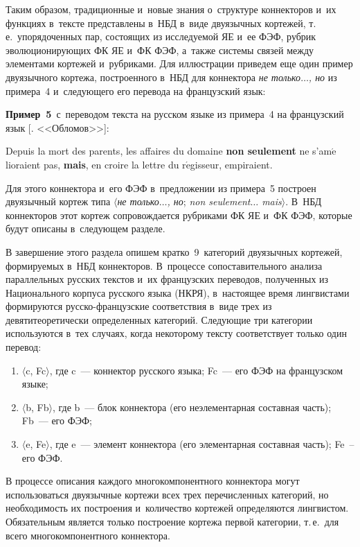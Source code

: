 \begin{multicols}{2}
  Таким образом, традиционные и~новые знания о~структуре коннекторов 
и~их функциях в~тексте представлены в~НБД в~виде двуязычных кортежей, 
т.\,е.\ упорядоченных пар, состоящих из исследуемой ЯЕ
и~ее ФЭФ, рубрик эволюционирующих ФК ЯЕ и~ФК ФЭФ, а~так\-же сис\-те\-мы 
связей между элементами кортежей и~руб\-ри\-ка\-ми. Для иллюстрации 
приведем еще один пример двуязычного кортежа, построенного в~НБД для 
коннектора \textit{не только$\ldots$, но} из примера~4 и~сле\-ду\-юще\-го его 
перевода на французский язык:
  
  \smallskip
  
  \noindent
  \textbf{Пример~5}\ с~переводом текста на русском языке из примера~4 на 
французский язык [. <<Обломов>>]:
  
  Depuis la mort des parents, les affaires du domaine \textbf{non seulement} ne 
s'am$\acute{\mbox{e}}$lioraient pas, \textbf{mais}, {} en croire la lettre du 
r$\acute{\mbox{e}}$gisseur, empiraient.
  
  Для этого коннектора и~его ФЭФ в~предложении из примера~5 построен 
двуязычный кортеж типа $\langle$\textit{не только$\ldots$, но}; \textit{non 
seulement$\ldots$ mais}$\rangle$. В~НБД коннекторов этот кортеж сопровождается 
рубриками ФК ЯЕ и~ФК ФЭФ, которые будут описаны в~следующем разделе.
  
  В завершение этого раздела опишем кратко~9~категорий двуязычных 
кортежей, формиру\-емых в~НБД коннекторов. В~процессе сопостави\-тельного 
анализа параллельных русских текстов и~их французских переводов, 
полученных из Наци\-о\-нального корпуса русского языка (НКРЯ), в~настоящее 
время лингвистами формируются рус\-ско-фран\-цуз\-ские соответствия в~виде 
трех из девяти\linebreak тео\-ре\-ти\-че\-ски определенных категорий. Следу\-ющие три 
категории используются в~тех случаях, когда некоторому текс\-ту 
соответствует только один перевод:
  \begin{enumerate}[(1)]
\item $\langle$c, Fc$\rangle$, где c~--- коннектор русского языка; Fc~--- его 
ФЭФ на французском языке;
\item $\langle$b, Fb$\rangle$, где b~--- блок коннектора (его неэлементарная 
составная часть); Fb~--- его ФЭФ;
\item $\langle$e, Fe$\rangle$, где e~--- элемент коннектора (его элементарная 
составная часть); Fe~-- его ФЭФ.
\end{enumerate}

  В процессе описания каждого многокомпонентного коннектора могут 
использоваться двуязычные кортежи всех трех перечисленных категорий, но 
необходимость их построения и~количество кортежей определяются 
лингвистом. Обязательным является только построение кортежа первой 
категории, т.\,е.\ для всего многокомпонентного коннектора.
  

\end{multicols}
